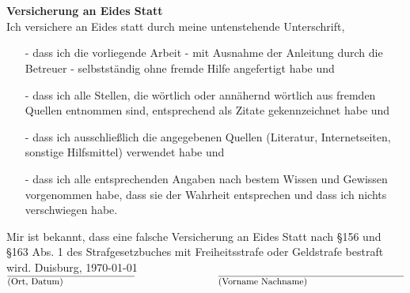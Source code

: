 
\

\cleardoublepage

\


\pagestyle{empty}

\textbf{Versicherung an Eides Statt}\\

Ich versichere an Eides statt durch meine untenstehende Unterschrift,
\begin{itemize}
\item[-] dass ich die vorliegende Arbeit - mit Ausnahme der Anleitung durch die Betreuer - selbstständig ohne fremde Hilfe angefertigt habe und
\item[-] dass ich alle Stellen, die wörtlich oder annähernd wörtlich aus fremden Quellen entnommen sind, entsprechend als Zitate gekennzeichnet habe und
\item[-] dass ich ausschließlich die angegebenen Quellen (Literatur, Internetseiten, sonstige Hilfsmittel) verwendet habe und
\item[-] dass ich alle entsprechenden Angaben nach bestem Wissen und Gewissen vorgenommen habe, dass sie der Wahrheit entsprechen und dass ich nichts verschwiegen habe.
\end{itemize}
Mir ist bekannt, dass eine falsche Versicherung an Eides Statt nach \S 156 und \S 163 Abs. 1 des Strafgesetzbuches mit Freiheitsstrafe oder Geldstrafe bestraft wird.
\vfill
Duisburg, \today\\
$\overline{\parbox{4.8cm}{(Ort, Datum)}} ~~~~~~~~~~~~~~~~~~~~~~~~~~~ \overline{\parbox{7cm}{(Vorname Nachname)}}$
